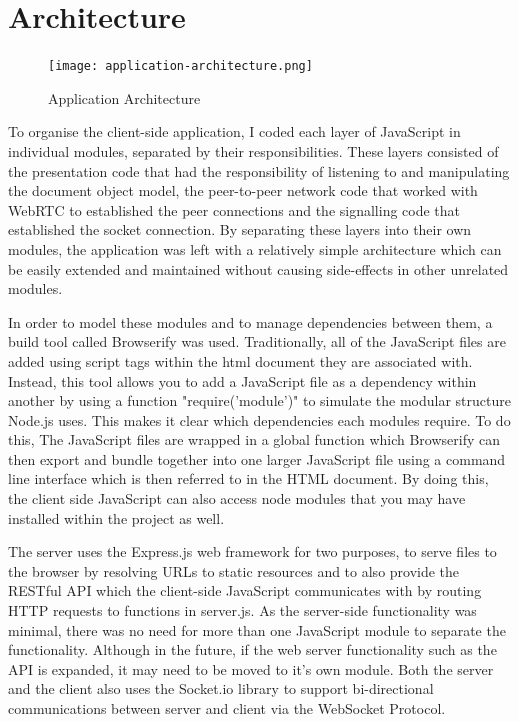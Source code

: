 \documentclass[]{report}
\begin{document}
		\section{Architecture}
			\begin{figure}[H]
				\caption{Application Architecture}
				\centering
				\texttt{[image: application-architecture.png]}
			\end{figure}
			To organise the client-side application, I coded each layer of JavaScript in individual modules, separated by their responsibilities. These layers consisted of the presentation code that had the responsibility of listening to and manipulating the document object model, the peer-to-peer network code that worked with WebRTC to established the peer connections and the signalling code that established the socket connection. By separating these layers into their own modules, the application was left with a relatively simple architecture which can be easily extended and maintained without causing side-effects in other unrelated modules.
			
			In order to model these modules and to manage dependencies between them, a build tool called Browserify was used. Traditionally, all of the JavaScript files are added using script tags within the html document they are associated with. Instead, this tool allows you to add a JavaScript file as a dependency within another by using a function "require('module')" to simulate the modular structure Node.js uses. This makes it clear which dependencies each modules require. To do this, The JavaScript files are wrapped in a global function which Browserify can then export and bundle together into one larger JavaScript file using a command line interface which is then referred to in the HTML document. By doing this, the client side JavaScript can also access node modules that you may have installed within the project as well.
			
			The server uses the Express.js web framework for two purposes, to serve files to the browser by resolving URLs to static resources and to also provide the RESTful API which the client-side JavaScript communicates with by routing HTTP requests to functions in server.js. As the server-side functionality was minimal, there was no need for more than one JavaScript module to separate the functionality. Although in the future, if the web server functionality such as the API is expanded, it may need to be moved to it's own module. Both the server and the client also uses the Socket.io library to support bi-directional communications between server and client via the WebSocket Protocol. 
			
\end{document}
